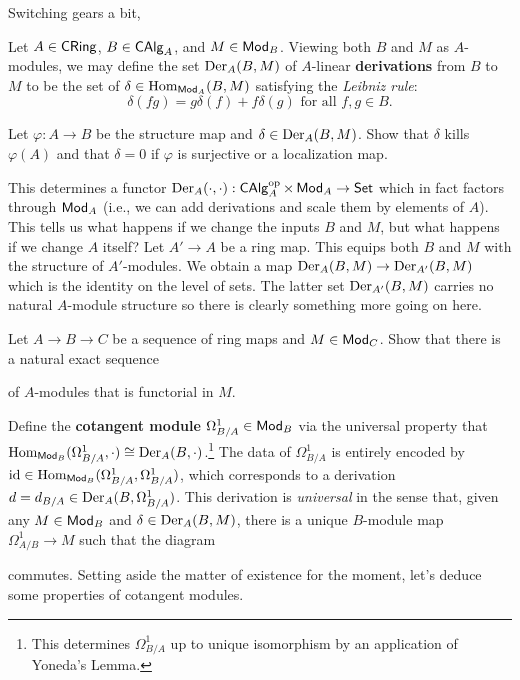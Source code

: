 \documentclass[11pt]{article}
\renewcommand{\phi}{\varphi}
\begin{document}
Switching gears a bit, 



Let $A\in\operatorname{\mathsf{CRing}}$, $B\in\operatorname{\mathsf{CAlg}}_A$, and $M\in\operatorname{\mathsf{Mod}}_B$. Viewing both $B$ and $M$ as $A$-modules, we may define the set $\operatorname{Der}_A(B,M)$ of $A$-linear \textbf{derivations} from $B$ to $M$ to be the set of $\delta\in\operatorname{Hom}_{\operatorname{\mathsf{Mod}}_A}(B,M)$ satisfying the \emph{Leibniz rule}:
$$\delta(fg)=g\delta(f)+f\delta(g)\textrm{ for all }f,g\in B.$$

\begin{exercise}
Let $\phi: A\to B$ be the structure map and $\delta\in\operatorname{Der}_A(B,M)$. Show that $\delta$ kills $\phi(A)$ and that $\delta=0$ if $\phi$ is surjective or a localization map.
\end{exercise}

This determines a functor $\operatorname{Der}_A(\cdot,\cdot): \operatorname{\mathsf{CAlg}}_A^{\operatorname{op}}\times\operatorname{\mathsf{Mod}}_A\to\operatorname{\mathsf{Set}}$ which in fact factors through $\operatorname{\mathsf{Mod}}_A$ (i.e., we can add derivations and scale them by elements of $A$). This tells us what happens if we change the inputs $B$ and $M$, but what happens if we change $A$ itself? Let $A'\to A$ be a ring map. This equips both $B$ and $M$ with the structure of $A'$-modules. We obtain a map $\operatorname{Der}_A(B,M)\to\operatorname{Der}_{A'}(B,M)$ which is the identity on the level of sets. The latter set $\operatorname{Der}_{A'}(B,M)$ carries no natural $A$-module structure so there is clearly something more going on here.

\begin{exercise}
Let $A\to B\to C$ be a sequence of ring maps and $M\in\operatorname{\mathsf{Mod}}_C$. Show that there is a natural exact sequence
\begin{center}
\end{center}
of $A$-modules that is functorial in $M$.
\end{exercise}

Define the \textbf{cotangent module} $\Omega_{B/A}^1\in\operatorname{\mathsf{Mod}}_B$ via the universal property that $\operatorname{Hom}_{\operatorname{\mathsf{Mod}}_B}(\Omega_{B/A}^1,\cdot)\cong\operatorname{Der}_A(B,\cdot)$.\footnote{This determines $\Omega_{B/A}^1$ up to unique isomorphism by an application of Yoneda's Lemma.} The data of $\Omega_{B/A}^1$ is entirely encoded by $\operatorname{id}\in\operatorname{Hom}_{\operatorname{\mathsf{Mod}}_B}(\Omega_{B/A}^1,\Omega_{B/A}^1)$, which corresponds to a derivation $d=d_{B/A}\in\operatorname{Der}_A(B,\Omega_{B/A}^1)$. This derivation is \emph{universal} in the sense that, given any $M\in\operatorname{\mathsf{Mod}}_B$ and $\delta\in\operatorname{Der}_A(B,M)$, there is a unique $B$-module map $\Omega_{A/B}^1\to M$ such that the diagram 
\begin{center}
\end{center}
commutes. Setting aside the matter of existence for the moment, let's deduce some properties of cotangent modules.
\end{document}
